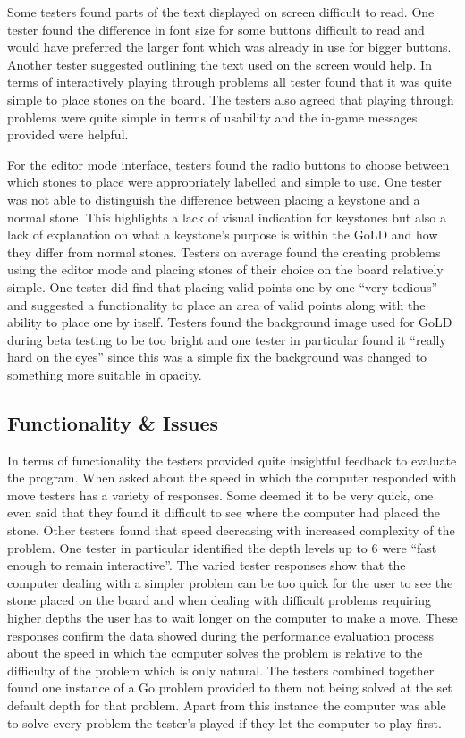 \documentclass{l4proj}
\begin{document}
Some testers found parts of the text displayed on screen difficult to read. One tester found the difference in font size for some buttons difficult to read and would have preferred the larger font which was already in use for bigger buttons. Another tester suggested outlining the text used on the screen would help. In terms of interactively playing through problems all tester found that it was quite simple to place stones on the board. The testers also agreed that playing through problems were quite simple in terms of usability and the in-game messages provided were helpful.

For the editor mode interface, testers found the radio buttons to choose between which stones to place were appropriately labelled and simple to use. One tester was not able to distinguish the difference between placing a keystone and a normal stone. This highlights a lack of visual indication for keystones but also a lack of explanation on what a keystone’s purpose is within the GoLD and how they differ from normal stones. Testers on average found the creating problems using the editor mode and placing stones of their choice on the board relatively simple. One tester did find that placing valid points one by one “very tedious” and suggested a functionality to place an area of valid points along with the ability to place one by itself.
Testers found the background image used for GoLD during beta testing to be too bright and one tester in particular found it “really hard on the eyes” since this was a simple fix the background was changed to something more suitable in opacity.


\subsection{Functionality \& Issues}
In terms of functionality the testers provided quite insightful feedback to evaluate the program. When asked about the speed in which the computer responded with move testers has a variety of responses. Some deemed it to be very quick, one even said that they found it difficult to see where the computer had placed the stone. Other testers found that speed decreasing with increased complexity of the problem. One tester in particular identified the depth levels up to 6 were “fast enough to remain interactive”. The varied tester responses show that the computer dealing with a simpler problem can be too quick for the user to see the stone placed on the board and when dealing with difficult problems requiring higher depths the user has to wait longer on the computer to make a move. These responses confirm the data showed during the performance evaluation process about the speed in which the computer solves the problem is relative to the difficulty of the problem which is only natural.
The testers combined together found one instance of a Go problem provided to them not being solved at the set default depth for that problem. Apart from this instance the computer was able to solve every problem the tester’s played if they let the computer to play first.
\end{document}
